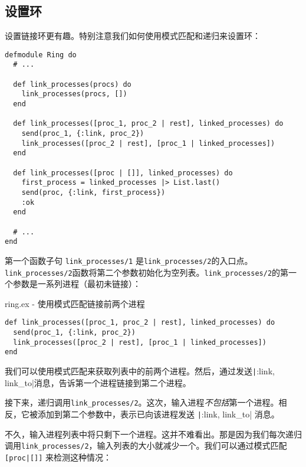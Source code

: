 \subsection{设置环}

设置链接环更有趣。特别注意我们如何使用模式匹配和递归来设置环：

\begin{code}{}  
\begin{verbatim}
defmodule Ring do
  # ...

  def link_processes(procs) do
    link_processes(procs, [])
  end

  def link_processes([proc_1, proc_2 | rest], linked_processes) do
    send(proc_1, {:link, proc_2})
    link_processes([proc_2 | rest], [proc_1 | linked_processes])
  end

  def link_processes([proc | []], linked_processes) do
    first_process = linked_processes |> List.last()
    send(proc, {:link, first_process})
    :ok
  end

  # ...
end
\end{verbatim}
\end{code}

第一个函数子句 \texttt{link\_processes/1} 是\texttt{link\_processes/2}的入口点。\texttt{link\_processes/2}函数将第二个参数初始化为空列表。\texttt{link\_processes/2}的第一个参数是一系列进程（最初未链接）：

\begin{code}{ring.ex - 使用模式匹配链接前两个进程}
\begin{verbatim}
def link_processes([proc_1, proc_2 | rest], linked_processes) do
  send(proc_1, {:link, proc_2})
  link_processes([proc_2 | rest], [proc_1 | linked_processes])
end
\end{verbatim}
\label{lst:use_pattern_matching_to_link_first_two_processes}
\end{code}

我们可以使用模式匹配来获取列表中的前两个进程。然后，通过发送\texttt|{:link, link_to}|消息，告诉第一个进程链接到第二个进程。

接下来，递归调用\texttt{link\_processes/2}。这次，输入进程\emph{不包括}第一个进程。相反，它被添加到第二个参数中，表示已向该进程发送
\texttt|{:link, link_to}| 消息。

不久，输入进程列表中将只剩下一个进程。这并不难看出。那是因为我们每次递归调用\texttt{link\_processes/2}，输入列表的大小就减少一个。我们可以通过模式匹配\texttt{[proc|[]]} 来检测这种情况：

